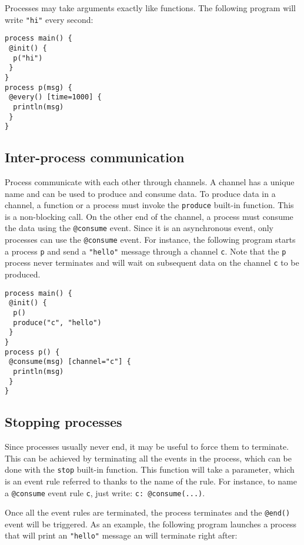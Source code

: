 \documentclass[11pt]{report}
\begin{document}
Processes may take arguments exactly like functions. The following program will write \texttt{"hi"} every second:

\begin{lstlisting}
process main() {
 @init() {
  p("hi")
 }
}
process p(msg) {
 @every() [time=1000] {
  println(msg)
 }
}
\end{lstlisting}

\subsection{Inter-process communication\label{sec:communication}}

Process communicate with each other through channels. A channel has a unique name and can be used to produce and consume data. To produce data in a channel, a function or a process must invoke the \texttt{produce} built-in function. This is a non-blocking call. On the other end of the channel, a process must consume the data using the  \texttt{@consume} event. Since it is an asynchronous event, only processes can use the  \texttt{@consume} event. For instance, the following program starts a process \texttt{p} and send a \texttt{"hello"} message through a channel \texttt{c}. Note that the  \texttt{p} process never terminates and will wait on subsequent data on the channel \texttt{c} to be produced.

\begin{lstlisting}
process main() {
 @init() {
  p()
  produce("c", "hello")
 }
}
process p() {
 @consume(msg) [channel="c"] {
  println(msg)
 }
}
\end{lstlisting}

\subsection{Stopping processes}

Since processes usually never end, it may be useful to force them to terminate. This can be achieved by terminating all the events in the process, which can be done with the \texttt{stop} built-in function. This function will take a parameter, which is an event rule referred to thanks to the name of the rule. For instance, to name a \texttt{@consume} event rule \texttt{c}, just write: \texttt{c: @consume(...)}. 

Once all the event rules are terminated, the process terminates and the \texttt{@end()} event will be triggered. As an example, the following program launches a process that will print an \texttt{"hello"} message an will terminate right after:
\end{document}
